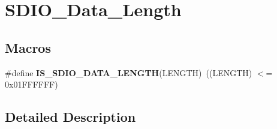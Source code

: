 \hypertarget{group___s_d_i_o___data___length}{\section{S\-D\-I\-O\-\_\-\-Data\-\_\-\-Length}
\label{group___s_d_i_o___data___length}
}
\subsection*{Macros}
\begin{DoxyCompactItemize}
\item 
\hypertarget{group___s_d_i_o___data___length_ga57dd64db3f69d18625ea8ca82c009fad}{\#define {\bfseries I\-S\-\_\-\-S\-D\-I\-O\-\_\-\-D\-A\-T\-A\-\_\-\-L\-E\-N\-G\-T\-H}(L\-E\-N\-G\-T\-H)~((L\-E\-N\-G\-T\-H) $<$= 0x01\-F\-F\-F\-F\-F\-F)}\label{group___s_d_i_o___data___length_ga57dd64db3f69d18625ea8ca82c009fad}

\end{DoxyCompactItemize}


\subsection{Detailed Description}
